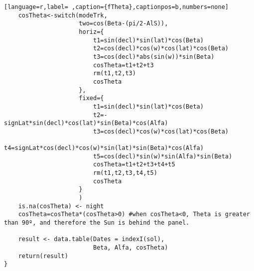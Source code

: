 \begin{lstlisting}[language=r,label= ,caption={fTheta},captionpos=b,numbers=none]
    cosTheta<-switch(modeTrk,
                     two=cos(Beta-(pi/2-AlS)),
                     horiz={
                         t1=sin(decl)*sin(lat)*cos(Beta)      
                         t2=cos(decl)*cos(w)*cos(lat)*cos(Beta)   
                         t3=cos(decl)*abs(sin(w))*sin(Beta)   
                         cosTheta=t1+t2+t3
                         rm(t1,t2,t3)
                         cosTheta
                     },
                     fixed={
                         t1=sin(decl)*sin(lat)*cos(Beta)      
                         t2=-signLat*sin(decl)*cos(lat)*sin(Beta)*cos(Alfa) 
                         t3=cos(decl)*cos(w)*cos(lat)*cos(Beta)   
                         t4=signLat*cos(decl)*cos(w)*sin(lat)*sin(Beta)*cos(Alfa) 
                         t5=cos(decl)*sin(w)*sin(Alfa)*sin(Beta)   
                         cosTheta=t1+t2+t3+t4+t5
                         rm(t1,t2,t3,t4,t5)
                         cosTheta
                     }
                     )
    is.na(cosTheta) <- night
    cosTheta=cosTheta*(cosTheta>0) #when cosTheta<0, Theta is greater than 90º, and therefore the Sun is behind the panel.

    result <- data.table(Dates = indexI(sol),
                         Beta, Alfa, cosTheta)
    return(result)
}
\end{lstlisting}
